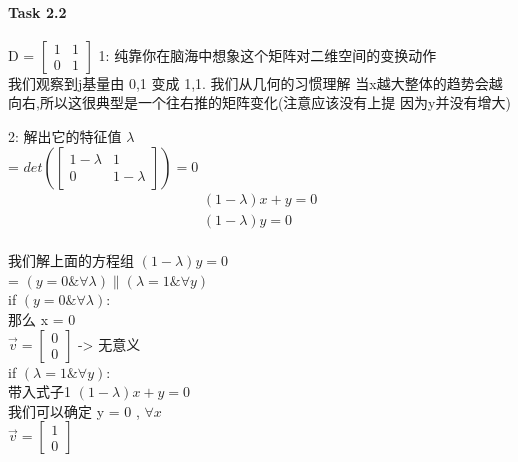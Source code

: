 \documentclass[12pt]{article}
\begin{document}
\paragraph{Task 2.2}
\begin{flushleft}
    D = $\begin{bmatrix}
            1 & 1 \\
            0 & 1
        \end{bmatrix}$
    1: 纯靠你在脑海中想象这个矩阵对二维空间的变换动作 \\
    我们观察到j基量由 0,1 变成 1,1. 我们从几何的习惯理解 当x越大整体的趋势会越向右,所以这很典型是一个往右推的矩阵变化(注意应该没有上提
    因为y并没有增大)

    2: 解出它的特征值 $\lambda $ \\
    = $det(\begin{bmatrix}
            1 -\lambda & 1           \\
            0          & 1 - \lambda
        \end{bmatrix}) = 0$ \\
    \begin{align}
        (1- \lambda)x + y = 0 \\
        (1 - \lambda)y  = 0
    \end{align} \\
    我们解上面的方程组 $  (1 - \lambda)y  = 0 $  \\
    = $(y = 0 \& \forall \lambda )  \| (\lambda = 1 \& \forall y )$ \\
    if $(y = 0 \& \forall \lambda )$: \\
    那么 x = 0 \\
    $\vec{v} = \begin{bmatrix}
            0 \\
            0
        \end{bmatrix}$ -> 无意义 \\
    if $(\lambda = 1 \& \forall y )$: \\
    带入式子1 $(1- \lambda)x + y = 0$ \\
    我们可以确定 y = 0 , $\forall x$ \\
    $\vec{v} = \begin{bmatrix}
            1 \\
            0
        \end{bmatrix}$


\end{flushleft}
\end{document}
